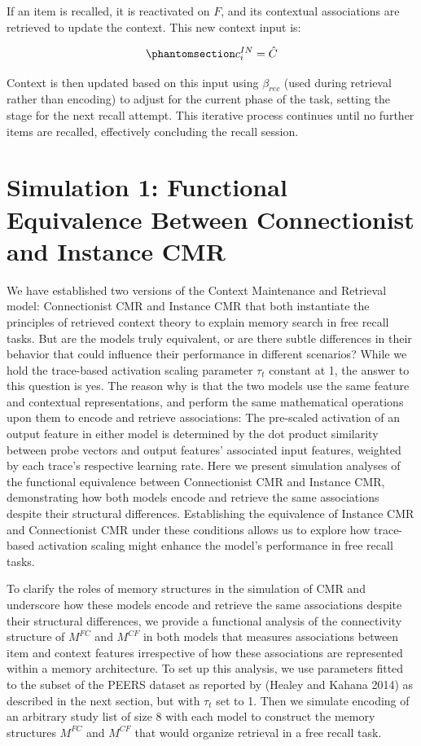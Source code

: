 \documentclass[
  letterpaper,
  11pt,
  english,
  singlespacing,
  headsepline]{MastersDoctoralThesis}
\begin{document}
If an item is recalled, it is reactivated on \(F\), and its contextual
associations are retrieved to update the context. This new context input
is:

\begin{equation}\phantomsection\label{eq-18}{
c^{IN}_{i} = \hat{C}
}\end{equation}

Context is then updated based on this input using \(\beta_{rec}\) (used
during retrieval rather than encoding) to adjust for the current phase
of the task, setting the stage for the next recall attempt. This
iterative process continues until no further items are recalled,
effectively concluding the recall session.

\section{Simulation 1: Functional Equivalence Between Connectionist and
Instance
CMR}\label{simulation-1-functional-equivalence-between-connectionist-and-instance-cmr}

We have established two versions of the Context Maintenance and
Retrieval model: Connectionist CMR and Instance CMR that both
instantiate the principles of retrieved context theory to explain memory
search in free recall tasks. But are the models truly equivalent, or are
there subtle differences in their behavior that could influence their
performance in different scenarios? While we hold the trace-based
activation scaling parameter \(\tau_{t}\) constant at 1, the answer to
this question is yes. The reason why is that the two models use the same
feature and contextual representations, and perform the same
mathematical operations upon them to encode and retrieve associations:
The pre-scaled activation of an output feature in either model is
determined by the dot product similarity between probe vectors and
output features' associated input features, weighted by each trace's
respective learning rate. Here we present simulation analyses of the
functional equivalence between Connectionist CMR and Instance CMR,
demonstrating how both models encode and retrieve the same associations
despite their structural differences. Establishing the equivalence of
Instance CMR and Connectionist CMR under these conditions allows us to
explore how trace-based activation scaling might enhance the model's
performance in free recall tasks.

To clarify the roles of memory structures in the simulation of CMR and
underscore how these models encode and retrieve the same associations
despite their structural differences, we provide a functional analysis
of the connectivity structure of \(M^{FC}\) and \(M^{CF}\) in both
models that measures associations between item and context features
irrespective of how these associations are represented within a memory
architecture. To set up this analysis, we use parameters fitted to the
subset of the PEERS dataset as reported by (Healey and Kahana 2014) as
described in the next section, but with \(\tau_{t}\) set to 1. Then we
simulate encoding of an arbitrary study list of size 8 with each model
to construct the memory structures \(M^{FC}\) and \(M^{CF}\) that would
organize retrieval in a free recall task.
\end{document}
